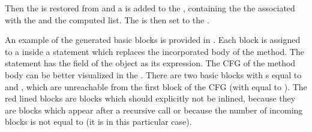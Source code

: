 Then the  is restored from  and a  is added to the
, containing the the  associated with the  and the
computed  list. The  is then set to the .

An example of the generated basic blocks is provided in . Each block is assigned to
a  inside a  statement which replaces the incorporated body of the method. The 
statement has the  field of the  object as its expression. The CFG of the method body can be
better visualized in the . There are two basic blocks with s equal to 
and , which are unreachable from the first block of the CFG (with  equal to ). The red lined
blocks are blocks which should explicitly not be inlined, because they are blocks which appear after a recursive call or
because the number of incoming blocks is not equal to  (it is  in this particular case).

